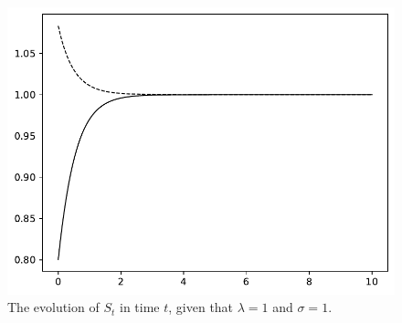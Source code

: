 \documentclass[a4paper, 11pt]{article}
\theoremstyle{plain} %
\begin{document}
\begin{figure}[!ht]
	\centering
	\includegraphics[scale=0.6]{figure_S_evolve.pdf}
	\caption{The evolution of $S_t$ in time $t$, given that $\lambda = 1$ and $\sigma = 1$.} \label{fig-S-evol}
\end{figure}
\end{document}

